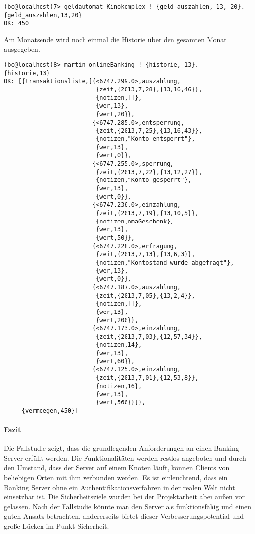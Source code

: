 \begin{lstlisting}
(bc@localhost)7> geldautomat_Kinokomplex ! {geld_auszahlen, 13, 20}.
{geld_auszahlen,13,20}
OK: 450  
\end{lstlisting}
Am Monatsende wird noch einmal die Historie über den gesamten Monat ausgegeben. 
\begin{lstlisting}
(bc@localhost)8> martin_onlineBanking ! {historie, 13}.                   
{historie,13}
OK: [{transaktionsliste,[{<6747.299.0>,auszahlung,
                          {zeit,{2013,7,28},{13,16,46}},
                          {notizen,[]},
                          {wer,13},
                          {wert,20}},
                         {<6747.285.0>,entsperrung,
                          {zeit,{2013,7,25},{13,16,43}},
                          {notizen,"Konto entsperrt"},
                          {wer,13},
                          {wert,0}},
                         {<6747.255.0>,sperrung,
                          {zeit,{2013,7,22},{13,12,27}},
                          {notizen,"Konto gesperrt"},
                          {wer,13},
                          {wert,0}},
                         {<6747.236.0>,einzahlung,
                          {zeit,{2013,7,19},{13,10,5}},
                          {notizen,omaGeschenk},
                          {wer,13},
                          {wert,50}},
                         {<6747.228.0>,erfragung,
                          {zeit,{2013,7,13},{13,6,3}},
                          {notizen,"Kontostand wurde abgefragt"},
                          {wer,13},
                          {wert,0}},
                         {<6747.187.0>,auszahlung,
                          {zeit,{2013,7,05},{13,2,4}},
                          {notizen,[]},
                          {wer,13},
                          {wert,200}},
                         {<6747.173.0>,einzahlung,
                          {zeit,{2013,7,03},{12,57,34}},
                          {notizen,14},
                          {wer,13},
                          {wert,60}},
                         {<6747.125.0>,einzahlung,
                          {zeit,{2013,7,01},{12,53,8}},
                          {notizen,16},
                          {wer,13},
                          {wert,560}}]},
     {vermoegen,450}]
\end{lstlisting}
\paragraph{Fazit}
Die Fallstudie zeigt, dass die grundlegenden Anforderungen an einen Banking Server erfüllt werden. Die Funktionalitäten werden restlos angeboten und durch den Umstand, dass der Server auf einem Knoten läuft, können Clients von beliebigen Orten mit ihm verbunden werden. Es ist einleuchtend, dass ein Banking Server ohne ein Authentifikationsverfahren in der realen Welt nicht einsetzbar ist. Die Sicherheitsziele wurden bei der Projektarbeit aber außen vor gelassen. Nach der Fallstudie könnte man den Server als funktionsfähig und einen guten Ansatz betrachten, andererseits bietet dieser Verbesserungspotential und große Lücken im Punkt Sicherheit.

